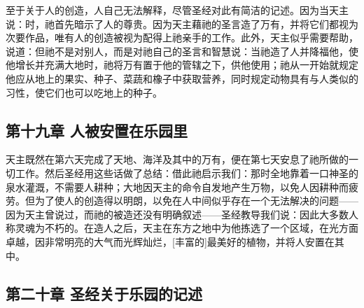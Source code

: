 至于关于人的创造，人自己无法解释，尽管圣经对此有简洁的记述。因为当天主说：时，祂首先暗示了人的尊贵。因为天主藉祂的圣言造了万有，并将它们都视为次要作品，唯有人的创造被视为配得上祂亲手的工作。此外，天主似乎需要帮助，说道：但祂不是对别人，而是对祂自己的圣言和智慧说：当祂造了人并降福他，使他增长并充满大地时，祂将万有置于他的管辖之下，供他使用；祂从一开始就规定他应从地上的果实、种子、菜蔬和橡子中获取营养，同时规定动物具有与人类似的习性，使它们也可以吃地上的种子。\par


\subsection{第十九章 人被安置在乐园里}

天主既然在第六天完成了天地、海洋及其中的万有，便在第七天安息了祂所做的一切工作。然后圣经用这些话做了总结：借此祂启示我们：那时全地靠着一口神圣的泉水灌溉，不需要人耕种；大地因天主的命令自发地产生万物，以免人因耕种而疲劳。但为了使人的创造得以明朗，以免在人中间似乎存在一个无法解决的问题——因为天主曾说过，而祂的被造还没有明确叙述——圣经教导我们说：因此大多数人称灵魂为不朽的。在造人之后，天主在东方之地中为他拣选了一个区域，在光方面卓越，因非常明亮的大气而光辉灿烂，[丰富的]最美好的植物，并将人安置在其中。\par


\subsection{第二十章 圣经关于乐园的记述}

